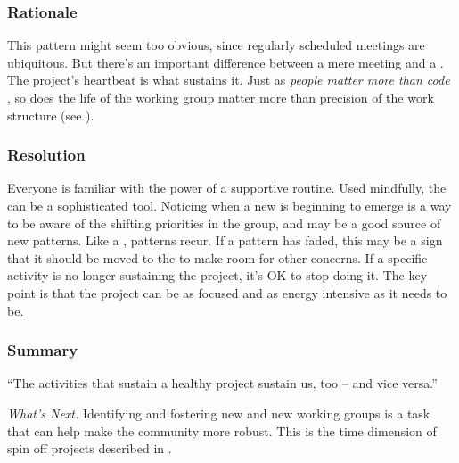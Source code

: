 \subsubsection*{Rationale}  This pattern might seem too obvious, since regularly scheduled meetings are ubiquitous.  
But there's an important difference between a mere meeting and a .  The project's heartbeat is what sustains it. Just as \emph{people matter more than code} \cite{torvalds-interview}, so does the life of the working group matter more than precision of the work structure (see ).

\subsubsection*{Resolution} Everyone is familiar with the power of a supportive routine. Used mindfully, the  can be a sophisticated tool.  Noticing when a new  is beginning to emerge is a way to be aware of the shifting priorities in the group, and may be a good source of new patterns.  Like a , patterns recur.  If a pattern has faded, this may be a sign that it should be moved to the  to make room for other concerns.  If a specific activity is no longer sustaining the project, it's OK to stop doing it.
%
The key point is that the project can be as focused and as energy intensive as it needs to be.

\subsubsection*{Summary}
``The activities that sustain a healthy project sustain us, too -- and vice versa.''

\begin{framed}
\noindent 
\emph{What's Next.}
Identifying and fostering new  and new working groups is a task that can help make the community more robust.  This is the time dimension of spin off projects described in .
\end{framed}


